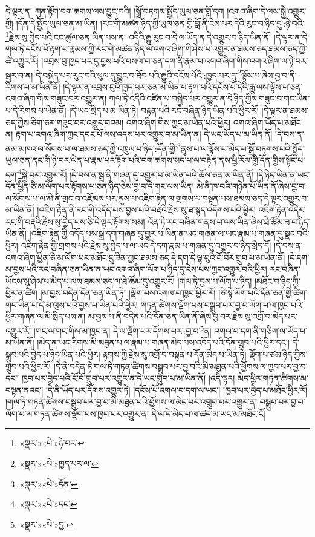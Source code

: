 དེ་ལྟར་ན། ཀུན་རྟོག་བག་ཆགས་ལས་བྱུང་བའི། །སྒྲོ་བཏགས་སྤྱོད་ཡུལ་ཅན་བློ་དག །འགའ་ཞིག་དེ་ལས་སྐྱེ་འགྱུར་གྱི། །དོན་དེ་སྤྱོད་ཡུལ་ཅན་མ་ཡིན། །རང་གི་མཚན་ཉིད་ཀྱི་ཡུལ་ཅན་གྱི་བློ་ནི་ངེས་པར་དེའི་རུང་བ་ཉིད་དུ་:ཉེ་བའི་\footnote{«སྣར་»«པེ་»ཉེ་བར་}རྗེས་སུ་བྱེད་པའི་ངང་ཚུལ་ཅན་ཡིན་པས་ན། འདིའི་རྒྱུ་རུང་བ་དེ་ལ་ཡོད་ན་དེ་འགྱུར་བ་ཉིད་ཡིན་ནོ། །དེ་ལྟར་ན་དེ་གལ་ཏེ་དངོས་པོ་རྟག་པ་རྣམས་ཀྱི་རང་གི་མཚན་ཉིད་ལ་འགའ་ཞིག་གི་ཤེས་པ་འགྱུར་ན་ཐམས་ཅད་ཐམས་ཅད་ཀྱི་ཚེ་འགྱུར་རོ། །འབྲས་བུ་ཁྱད་པར་དུ་བྱས་པའི་བསལ་བ་ཅན་དག་ནི་རྣམ་པ་འགའ་ཞིག་གིས་འགའ་ཞིག་ལ་ཉེ་བར་སྦྱར་བ་ན། དེ་བསྐྱེད་པར་རུང་བའི་ཕུལ་དུ་བྱུང་བ་ཐོབ་པའི་རྒྱུའི་དངོས་པོའི་:ཁྱད་པར་དུ་\footnote{«སྣར་»«པེ་»ཁྱད་པར་ལ་}ལྟོས་པ་ཞེས་བྱ་བ་ནི་རིགས་པ་མ་ཡིན་ནོ། །དེ་ལྟར་ན་འབྲས་བུའི་ཁྱད་པར་ཅན་མ་ཡིན་པ་རྟག་པའི་དངོས་པོ་དེའི་རྒྱུ་ལས་ལྟོས་པ་ཅན་འགའ་ཞིག་གིས་གཟུང་བར་འགྱུར་ན། གལ་ཏེ་འདིའི་འཛིན་པ་བསྐྱེད་པར་འགྱུར་ན་དེ་ཉིད་ཀྱིས་གཟུང་བ་གང་ཡིན་པ་དེ་རིགས་པ་ཡིན་ནོ། །དེ་ཡང་སྲིད་པ་མ་ཡིན་ཏེ། བརྟན་པའི་རང་བཞིན་ཉིད་ཡིན་པའི་ཕྱིར་རོ། །དེ་ལྟར་ན་ཐམས་ཅད་ཀྱིས་ཅིག་ཅར་གཟུང་བར་འགྱུར་བའམ། འགའ་ཞིག་གིས་ཀྱང་མ་ཡིན་པའི་ཕྱིར། འགའ་ཞིག་ཡོད་པ་མཐོང་ན། རྟག་པ་འགའ་ཞིག་ཀྱང་དབང་པོ་ལས་འདས་པར་འགྱུར་བ་མ་ཡིན་ན། དེ་ཡང་ཡོད་པ་མ་ཡིན་ནོ། །དེ་བས་ན་ནམ་མཁའ་ལ་སོགས་པ་ལ་ཐམས་ཅད་ཀྱི་འཁྲུལ་པ་ཉིད་:དོན་གྱི་\footnote{«སྣར་»«པེ་»དོན་}ནུས་པ་ལ་ལྟོས་པ་མེད་པ་སྒྲོ་བཏགས་པའི་སྤྱོད་ཡུལ་ཅན་ནང་གི་ཉེ་བར་ལེན་པ་རྣམ་པར་རྟོག་པའི་བག་ཆགས་སད་པ་ལ་བརྟེན་ནས་ཕྱི་རོལ་གྱི་དོན་གྱིས་སྟོང་པ་དག་\footnote{«སྣར་»«པེ་»དང་}སྐྱེ་བར་འགྱུར་རོ། །དེ་བས་ན་སྒྲ་ནི་གཞན་དུ་འགྱུར་བ་མ་ཡིན་པའི་ཆོས་ཅན་མ་ཡིན་ནོ། །དེ་ཉིད་ཡིན་ན་ཡང་དོན་ཕྱིན་ཅི་མ་ལོག་པར་རྟོགས་པ་ཅན་ཉིད་ཅེས་བྱ་བ་དེ་གང་ལས་ཡིན། མེ་ནི་ཁ་བའི་གཉེན་པོ་ཡིན་ནོ་ཞེས་བྱ་བ་ལ་སོགས་པ་ལ་མེ་ནི་གྲང་བ་འཇོམས་པར་ནུས་པ་འཇིག་རྟེན་ལ་གྲགས་པ་བསྟན་པས་ཐམས་ཅད་དེ་ལྟར་འགྱུར་བ་མ་ཡིན་ནོ། །འཇིག་རྟེན་ནི་རང་གི་འདོད་པས་བྱས་པའི་བརྡའི་རྗེས་སུ་ཐ་སྙད་འདོགས་པའི་ཕྱིར། འཇིག་རྟེན་འདིར་རང་གི་བརྡའི་རྗེས་སུ་བྱེད་པས་ཅི་དེ་ལྟར་རྟོགས་སམ། འོན་ཏེ་རང་བཞིན་གནས་པ་ལས་ཡིན་ཞེས་ཐེ་ཚོམ་ཟ་བ་ཉིད་ཡིན་ནོ། །འཇིག་རྟེན་གྱི་འདོད་པས་སྒྲ་དག་གཞན་དུ་གྱུར་པ་ཡིན་ན་ཡང་གཞན་ལ་ཡང་རྣམ་པ་གཞན་དུ་སྣང་བའི་ཕྱིར། འཇིག་རྟེན་གྱི་གྲགས་པའི་རྗེས་སུ་བྱེད་པ་ལ་ཡང་དེ་དག་རྣམ་པ་གཞན་དུ་འགྱུར་བ་ཉིད་སྲིད་དོ། །དེ་བས་ན་འགའ་ཞིག་ཕྱིན་ཅི་མ་ལོག་པར་མཐོང་དུ་ཟིན་ཀྱང་ཐམས་ཅད་དེ་དག་དེ་ལྟ་བུའི་ངོ་བོར་གྲུབ་པ་མ་ཡིན་ནོ། །དེ་དག་མ་བྱས་པའི་རང་བཞིན་ཅན་ཡིན་ན་ཡང་འགའ་ཞིག་ལོག་པ་ཉིད་དུ་ངེས་པས་ཀྱང་འགྱུར་བའི་ཕྱིར། རང་བཞིན་ཡོངས་སུ་ཤེས་པ་མེད་པ་ལས་ཐམས་ཅད་ལ་ཐེ་ཚོམ་དུ་འགྱུར་རོ། །གལ་ཏེ་བྱས་པ་ལོག་པ་ཉིད། །མཐོང་བ་ཉིད་ཀྱི་ཕྱིར་ན་ཚིག །མ་བྱས་བདེན་དོན་ཅན་ཡིན་ཏེ། །ལྡོག་པས་འགལ་བ་ཁྱབ་ཕྱིར་རོ། །ཅི་སྟེ་ལོག་པའི་དོན་ཅན་གྱི་ཚིག་གང་ཡིན་པ་དེ་མ་ལུས་པའི་བྱས་པ་ཡིན་པའི་ཕྱིར། གཏན་ཚིགས་ལྡོག་པས་བསྒྲུབ་པར་བྱ་བ་ལོག་པ་ལ་ཁྱབ་པའི་ཕྱིར་གཞན་ལ་མི་སྲིད་པས་ན། མ་བྱས་པ་ནི་བདེན་པའི་དོན་ཅན་ཡིན་ནོ་ཞེས་བྱ་བར་རྗེས་སུ་འགྲོ་བ་མེད་པར་འགྱུར་རོ། །གང་ལ་གང་གིས་མ་ཁྱབ་ན། དེ་ལ་ལྡོག་པར་དོགས་པར་:བྱ་བ་\footnote{«སྣར་»«པེ་»བྱ་}ན། འགལ་བ་དག་ནི་གཅིག་ལ་ཡོད་པ་མ་ཡིན་ནོ། །མེད་ན་ཡང་རིགས་མི་མཐུན་པ་ལ་རྣམ་པ་གཞན་མེད་པས་འདོད་པའི་དོན་གྲུབ་པའི་ཕྱིར་དང་། དེ་སྒྲུབ་པའི་བྱེད་པ་ཉིད་ཡིན་པའི་ཕྱིར། རྟགས་ཀྱི་རྗེས་སུ་འགྲོ་བ་བསྟན་པ་དོན་མེད་པ་ཡིན་ཏེ། ལྡོག་པ་ཙམ་ཉིད་ཀྱིས་གྲུབ་པའི་ཕྱིར་རོ། །དེ་ནི་བདེན་ཏེ་གལ་ཏེ་གཏན་ཚིགས་བསྒྲུབ་པར་བྱ་བའི་མི་མཐུན་པའི་ཕྱོགས་ལ་ཁྱབ་པར་བྱ་བ་དང་། ཁྱབ་པར་བྱེད་པའི་ངོ་བོ་གྲུབ་པར་འགྱུར་ན་དེ་ཡང་གྲུབ་པ་མ་ཡིན་ནོ། །འདི་ལྟར། མེད་ཕྱིར་གཏན་ཚིགས་མ་བསྟན་ནའང་། །དེ་ནི་ཡོད་པར་དོགས་འགྱུར་ཏེ། །དངོས་པོ་འགལ་བ་དག་ལ་ཡང་། །ཁྱབ་པར་བྱེད་པ་མཐོང་ཕྱིར་རོ། །གལ་ཏེ་གཏན་ཚིགས་བསྒྲུབ་པར་བྱ་བ་མི་མཐུན་པའི་ཕྱོགས་ལ་མེད་པར་འགྲུབ་པར་འགྱུར་ན། བསྒྲུབ་པར་བྱ་བ་ལོག་པ་ལ་གཏན་ཚིགས་ལྡོག་པས་ཁྱབ་པར་འགྱུར་ན། དེ་ལ་དེ་མེད་པ་ལ་ཚད་མ་ཡང་མ་མཐོང་ངོ། 